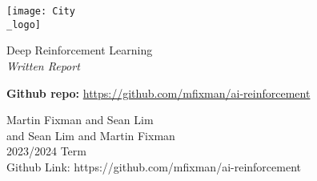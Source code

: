 \documentclass[table,dvipsnames,11pt,a4paper]{article}
\begin{document}
\begin{titlepage}
	\centering
	\texttt{[image: City\\\_logo]} \\[4em]
	\begin{bfseries}
		\begin{Huge}
			Deep Reinforcement Learning \\[35pt]
			\textsl{Written Report}
		\end{Huge}
	\end{bfseries}
	\vfill{}
	\begin{large}
		\textbf{Github repo:} \url{https://github.com/mfixman/ai-reinforcement} \\[1em]
	\end{large}
	\begin{LARGE}
		\begin{sffamily}
			Martin Fixman and Sean Lim \\
			and Sean Lim and Martin Fixman \\
			2023/2024 Term \\
                Github Link: https://github.com/mfixman/ai-reinforcement \\
		\end{sffamily}
	\end{LARGE}
\end{titlepage}







\clearpage{}




\clearpage{}

\begin{appendices}
	
	\clearpage{}
	
	\clearpage{}
	
\end{appendices}

\clearpage{}

\end{document}
